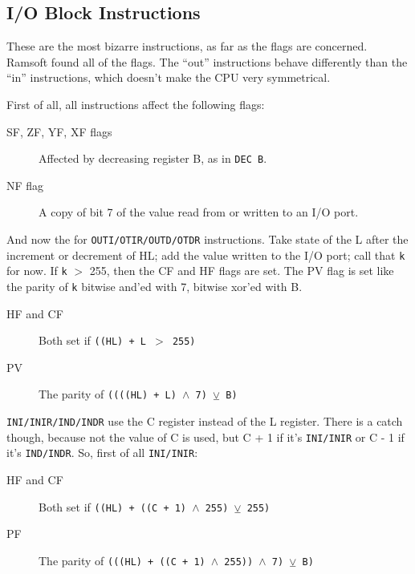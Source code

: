 \pagebreak
\subsection{I/O Block Instructions}
\label{block_io}

These are the most bizarre instructions, as far as the flags are concerned. Ramsoft found all of the flags. The ``out'' instructions behave differently than the ``in'' instructions, which doesn't make the CPU very symmetrical. 

First of all, all instructions affect the following flags:

\begin{description}

    \item[SF, ZF, YF, XF flags]
    Affected by decreasing register B, as in {\tt DEC B}.

    \item[NF flag]
    A copy of bit 7 of the value read from or written to an I/O port.

\end{description}

And now the for {\tt OUTI/OTIR/OUTD/OTDR} instructions. Take state of the L after the increment or decrement of HL; add the value written to the I/O port; call that {\tt k} for now. If {\tt k} $>$ 255, then the CF and HF flags are set. The PV flag is set like the parity of {\tt k} bitwise and'ed with 7, bitwise xor'ed with B.

\begin{description}

    \item[HF and CF]
    Both set if {\tt ((HL) + L  $>$ 255)}

    \item[PV]
    The parity of {\tt ((((HL) + L) $\wedge$ 7) $\veebar$ B)}

\end{description}

{\tt INI/INIR/IND/INDR} use the C register instead of the L register. There is a catch though, because not the value of C is used, but C + 1 if it's {\tt INI/INIR} or C - 1 if it's {\tt IND/INDR}. So, first of all {\tt INI/INIR}:

\begin{description}

    \item[HF and CF]
    Both set if {\tt ((HL) + ((C + 1) $\wedge$ 255)  $\veebar$ 255)}

    \item[PF]
    The parity of {\tt (((HL) + ((C + 1) $\wedge$ 255)) $\wedge$ 7) $\veebar$ B)}

\end{description}

